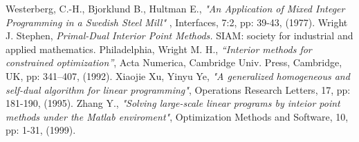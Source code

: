 \documentclass[a4paper,10 pt,titlepage,twoside]{book}
\theoremstyle{plain}
\theoremstyle{definition}
\theoremstyle{remark}
\begin{document}
\begin{thebibliography}{9}

 Westerberg, C.-H., Bjorklund B., Hultman E., \emph{"An Application of Mixed Integer Programming in a Swedish Steel Mill" }, Interfaces, 7:2, pp: 39-43, (1977).
 Wright J. Stephen, \emph{\;Primal-Dual Interior Point Methods.} SIAM: society for industrial and applied mathematics. Philadelphia, %
Wright M. H.,\textit{ “Interior methods for constrained optimization”}, Acta Numerica, Cambridge Univ. Press, Cambridge, UK, pp: 341–407, (1992).
Xiaojie Xu, Yinyu Ye, \emph{"A generalized homogeneous and self-dual algorithm for linear programming"}, Operations Research Letters, 17, pp: 181-190, (1995).
Zhang Y., \textit{ "Solving large-scale linear programs by inteior point methods under
the Matlab enviroment"}, Optimization Methods and Software, 10, pp: 1-31, (1999).
\end{thebibliography}
\end{document}
